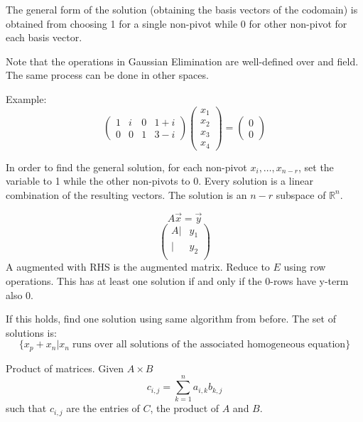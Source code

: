 The general form of the solution (obtaining the basis vectors of the codomain) is obtained from choosing 1 for a single non-pivot while 0 for other non-pivot for each basis vector.

Note that the operations in Gaussian Elimination are well-defined over and field. The same process can be done in other spaces.

Example:	
\[\begin{pmatrix} 
	1 & i & 0 & 1+ i\\
	0 &0 &1 &3-i	
\end{pmatrix}
\begin{pmatrix} 
	x_1\\x_2\\x_3\\x_4
\end{pmatrix} = \begin{pmatrix} 
	0 \\ 0
\end{pmatrix}
\]



In order to find the general solution, for each non-pivot $x_i,\hdots,x_{n-r}$, set the variable to 1 while the other non-pivots to 0. Every solution is a linear combination of the resulting vectors. The solution is an $n-r$ subspace of $\mathbb{R}^n$.

\begin{theorem} 
	\[A\vec x = \vec y\]
	\begin{equation} 
	\begin{pmatrix} 
		A | &y_1\\
		 | & y_2\\
	\end{pmatrix}
	\end{equation}
	A augmented with RHS is the augmented matrix. Reduce to $E$ using row operations. This has at least one solution if and only if the 0-rows have y-term also 0.

	If this holds, find one solution using same algorithm from before. The set of solutions is:
	\[\{x_p+x_n | x_n \;\textrm{runs over all solutions of the associated homogeneous equation}\}\]
\end{theorem}



\begin{definition} 
	Product of matrices. Given $A\times B$
	\[c_{i,j} = \sum_{k=1}^n a_{i,k}b_{k,j}\]
	such that $c_{i,j}$ are the entries of $C$, the product of $A$ and $B$.
\end{definition}

